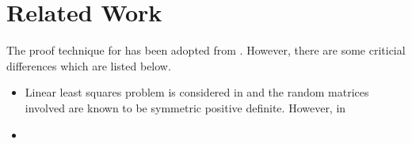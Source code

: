 \section{Related Work}
The proof technique for  has been adopted from \cite{bachharder}. However, there are some criticial differences which are listed below.
\begin{itemize}[leftmargin=*]
\item Linear least squares problem is considered in \cite{bachharder} and the random matrices involved are  known to be symmetric positive definite. However, in 
\item
\end{itemize}
